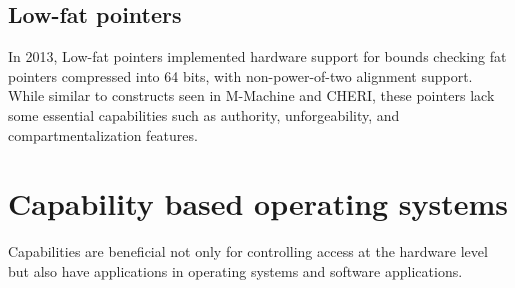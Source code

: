 \subsection{Low-fat pointers}
In 2013, Low-fat pointers\cite{kwon_low-fat_2013} implemented hardware support for bounds checking fat pointers compressed into 
64 bits, with non-power-of-two alignment support. While similar to constructs seen in 
M-Machine and CHERI, these pointers lack some essential capabilities such as authority, 
unforgeability, and compartmentalization features.
\newline


\section{Capability based operating systems}
Capabilities are beneficial not only for controlling access at the hardware level but also 
have applications in operating systems and software applications.
\newline

